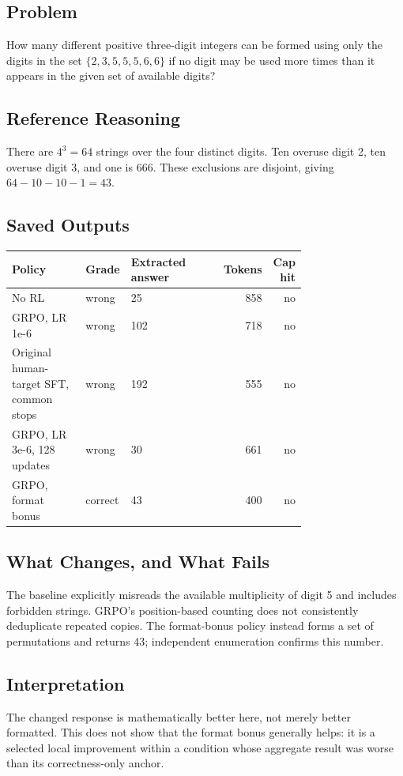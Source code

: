 \documentclass[10pt,letterpaper]{article}
\begin{document}
\subsection*{Problem}
How many different positive three-digit integers can be formed using only the digits in the set $\{2, 3, 5, 5, 5, 6, 6\}$ if no digit may be used more times than it appears in the given set of available digits?
\subsection*{Reference Reasoning}
There are $4^3=64$ strings over the four distinct digits. Ten overuse digit 2, ten overuse digit 3, and one is 666. These exclusions are disjoint, giving $64-10-10-1=43$.
\subsection*{Saved Outputs}
\small\begin{longtable}{p{0.29\linewidth}p{0.10\linewidth}p{0.35\linewidth}rr}\toprule Policy & Grade & Extracted answer & Tokens & Cap hit\\\midrule
No RL & wrong & 25 & 858 & no\\
GRPO, LR 1e-6 & wrong & 102 & 718 & no\\
Original human-target SFT, common stops & wrong & 192 & 555 & no\\
GRPO, LR 3e-6, 128 updates & wrong & 30 & 661 & no\\
GRPO, format bonus & correct & 43 & 400 & no\\
\bottomrule\end{longtable}\normalsize
\subsection*{What Changes, and What Fails}
The baseline explicitly misreads the available multiplicity of digit 5 and includes forbidden strings. GRPO's position-based counting does not consistently deduplicate repeated copies. The format-bonus policy instead forms a set of permutations and returns 43; independent enumeration confirms this number.
\subsection*{Interpretation}
The changed response is mathematically better here, not merely better formatted. This does not show that the format bonus generally helps: it is a selected local improvement within a condition whose aggregate result was worse than its correctness-only anchor.
\end{document}
